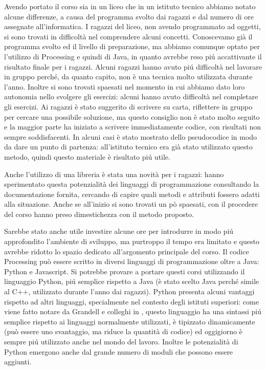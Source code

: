 Avendo portato il corso sia in un liceo che in un istituto tecnico abbiamo notato alcune differenze, a causa del programma svolto dai ragazzi e dal numero di ore assegnate all'informatica. I ragazzi del liceo, non avendo programmato ad oggetti, si sono trovati in difficoltà nel comprendere alcuni concetti. Conoscevamo già il programma svolto ed il livello di preparazione, ma abbiamo comunque optato per l'utilizzo di Processing e quindi di Java, in quanto avrebbe reso piú accattivante il risultato finale per i ragazzi. Alcuni ragazzi hanno avuto piú difficoltà nel lavorare in gruppo perché, da quanto capito, non è una tecnica molto utilizzata durante l'anno. Inoltre si sono trovati spaesati nel momento in cui abbiamo dato loro autonomia nello svolgere gli esercizi: alcuni hanno avuto difficoltà nel completare gli esercizi. Ai ragazzi è stato suggerito di scrivere su carta, riflettere in gruppo per cercare una possibile soluzione, ma questo consiglio non è stato molto seguito e la maggior parte ha iniziato a scrivere immediatamente codice, con risultati non sempre soddisfacenti. In alcuni casi è stato mostrato dello pseudocodice in modo da dare un punto di partenza: all'istituto tecnico era già stato utilizzato questo metodo, quindi questo materiale è risultato piú utile.

Anche l'utilizzo di una libreria è stata una novità per i ragazzi: hanno sperimentato questa potenzialità dei linguaggi di programmazione consultando la documentazione fornita, cercando di capire quali metodi e attributi fossero adatti alla situazione. Anche se all'inizio si sono trovati un pò spaesati, con il procedere del corso hanno preso dimestichezza con il metodo proposto.

Sarebbe stato anche utile investire alcune ore per introdurre in modo piú approfondito l'ambiente di sviluppo, ma purtroppo il tempo era limitato e questo avrebbe ridotto lo spazio dedicato all'argomento principale del corso. Il codice Processing può essere scritto in diversi linguaggi di programmazione oltre a Java: Python e Javascript. Si potrebbe provare a portare questi corsi utilizzando il linguaggio Python, piú semplice rispetto a Java (è stato scelto Java perché simile al C++, utilizzato durante l'anno dai ragazzi). Python presenta alcuni vantaggi rispetto ad altri linguaggi, specialmente nel contesto degli istituti superiori: come viene fatto notare da Grandell e colleghi in \cite{python_high_school}, questo linguaggio ha una sintassi piú semplice rispetto ai linguaggi normalmente utilizzati, è tipizzato dinamicamente (può essere uno svantaggio, ma riduce la quantità di codice) ed oggigiorno è sempre piú utilizzato anche nel mondo del lavoro. Inoltre le potenzialità di Python emergono anche dal grande numero di moduli che possono essere aggiunti. 

